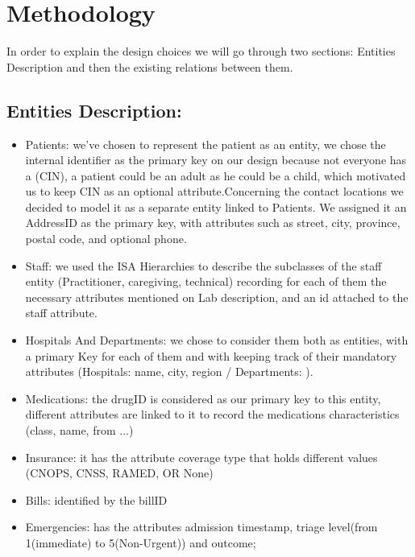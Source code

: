 \documentclass[a4paper,12pt]{article}
\begin{document}
\section{Methodology}
In order to explain the design choices we will go through two sections: Entities Description and then the existing relations between them.
\subsection{Entities Description: }
\begin{itemize}
    \item Patients: we've chosen to represent the patient as an entity, we chose the internal identifier as the primary key on our design because not everyone has a (CIN), a patient could be an adult as he could be a child, which motivated us to keep CIN as an optional attribute.Concerning the contact locations we decided to model it as a separate entity linked to Patients. We assigned it an AddressID as the primary key, with attributes such as street, city, province, postal code, and optional phone.
    \item Staff: we used the ISA Hierarchies to describe the subclasses of the staff entity (Practitioner, caregiving, technical) recording for each of them the necessary attributes mentioned on Lab description, and an id attached to the staff attribute. 
    \item Hospitals And Departments: we chose to consider them both as entities, with a primary Key for each of them and with keeping track of their mandatory attributes (Hospitals: name, city, region / Departments: ).
    \item Medications: the drugID is considered as our primary key to this entity, different attributes are linked to it to record the medications characteristics (class, name, from ...)
    \item Insurance: it has the attribute coverage type that holds different values (CNOPS, CNSS, RAMED, OR None)
    \item Bills: identified by the billID
    \item Emergencies: has the attributes admission timestamp, triage level(from 1(immediate) to 5(Non-Urgent)) and outcome;
\end{itemize}
\end{document}
